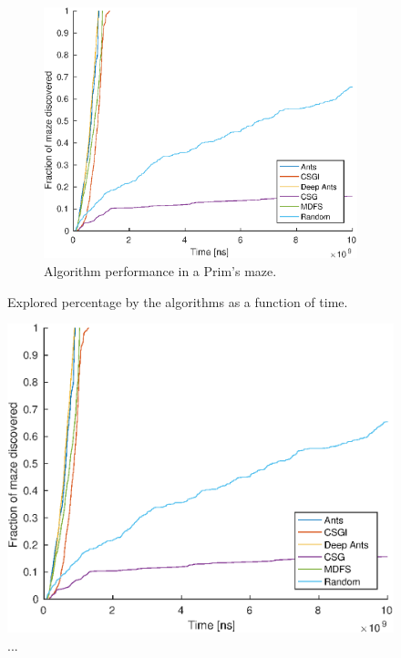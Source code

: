 \documentclass{article}
\begin{document}
\begin{figure}[H]
    \begin{subfigure}[b]{0.45\textwidth}
        \includegraphics[width=\textwidth]{Covered_vs_time_for_3_agents_on_50x50_map_Easy=10.eps}
        \caption{ Algorithm performance in a Prim's maze. }
    \end{subfigure}
    
    \caption{Explored percentage by the algorithms as a function of
      time.}
    \label{fig:perf_time}
\end{figure}

\begin{figure}[H]
  \centering
      \includegraphics[width=\textwidth]{Covered_vs_time_for_3_agents_on_50x50_map_Easy=10.eps}
  \caption{...}
\end{figure}
\end{document}
